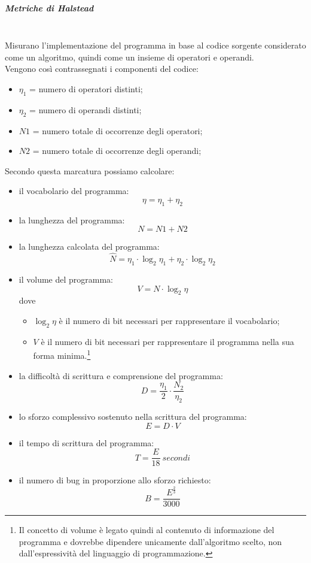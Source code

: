 \subparagraph{Metriche di Halstead}\mbox{}\\
Misurano l'implementazione del programma in base al codice sorgente considerato come un algoritmo, quindi come un insieme di operatori e operandi.\\
Vengono così contrassegnati i componenti del codice:
\begin{itemize}
	\item $\eta_{1}$ = numero di operatori distinti;
	\item $\eta_{2}$ = numero di operandi distinti;
	\item $N1$ = numero totale di occorrenze degli operatori; 
	\item $N2$ = numero totale di occorrenze degli operandi;
\end{itemize}
Secondo questa marcatura possiamo calcolare:
\begin{itemize}
	\item il vocabolario del programma:
	\[ \eta = \eta_{1} + \eta_{2} \]
	\item la lunghezza del programma:
	\[ N = N1 + N2 \]
	\item la lunghezza calcolata del programma: 
	\[ {\hat {N}}=\eta_{1} \cdot \log_{2}\eta_{1}+\eta_{2} \cdot \log_{2}\eta_{2} \]
	\item il volume del programma:
	\[ V = N \cdot \log_{2}\eta \] 
	dove
	\begin{itemize}
		\item $ \log_{2}\eta $ è il numero di bit necessari per rappresentare il vocabolario;
		\item $ V $ è il numero di bit necessari per rappresentare il programma nella sua forma minima.\footnote{Il concetto di volume è legato quindi al contenuto di informazione del programma e dovrebbe dipendere unicamente dall'algoritmo scelto, non dall'espressività del linguaggio di programmazione.}
	\end{itemize}
	\item la difficoltà di scrittura e comprensione del programma:
	\[ D = \frac{\eta_{1}}{2} \cdot \frac{N_{2}}{\eta_{2}} \]
	\item lo sforzo complessivo sostenuto nella scrittura del programma:
	\[ E = D \cdot V \]
	\item il tempo di scrittura del programma:
	\[ T=\frac{E}{18}\ secondi\]
	\item il numero di bug in proporzione allo sforzo richiesto:
	\[ B = \frac{E^{\frac{2}{3}}}{3000} \]	
\end{itemize}

